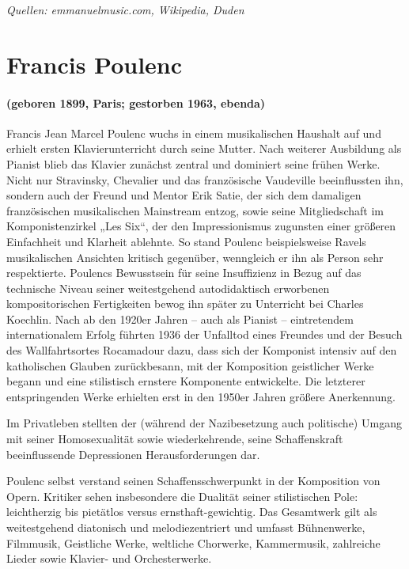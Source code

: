 \documentclass[11pt, ngermanm, titlepage]{article}
\begin{document}
\begin{multicols}{2}
	\textit{Quellen: emmanuelmusic.com,	Wikipedia, Duden}
	
	
	\section*{Francis Poulenc}
	\paragraph{(geboren 1899, Paris; gestorben 1963, ebenda)\newline}
	Francis Jean Marcel Poulenc wuchs in einem musikalischen Haushalt auf und erhielt ersten Klavierunterricht durch seine Mutter. Nach weiterer Ausbildung als Pianist blieb das Klavier zunächst zentral und dominiert seine frühen Werke. Nicht nur Stravinsky, Chevalier und das französische Vaudeville beeinflussten ihn, sondern auch der Freund und Mentor Erik Satie, der sich dem damaligen französischen musikalischen Mainstream entzog, sowie seine Mitgliedschaft im Komponistenzirkel „Les Six“, der den Impressionismus zugunsten einer größeren Einfachheit und Klarheit ablehnte. So stand Poulenc beispielsweise Ravels musikalischen Ansichten kritisch gegenüber, wenngleich er ihn als Person sehr respektierte. Poulencs Bewusstsein für seine Insuffizienz in Bezug auf das technische Niveau seiner weitestgehend autodidaktisch erworbenen kompositorischen Fertigkeiten bewog ihn später zu Unterricht bei Charles Koechlin. Nach ab den 1920er Jahren – auch als Pianist – eintretendem internationalem Erfolg führten 1936 der Unfalltod eines Freundes und der Besuch des Wallfahrtsortes Rocamadour dazu, dass sich der Komponist intensiv auf den katholischen Glauben zurückbesann, mit der Komposition geistlicher Werke begann und eine stilistisch ernstere Komponente entwickelte. Die letzterer entspringenden Werke erhielten erst in den 1950er Jahren größere Anerkennung.
	
	Im Privatleben stellten der (während der Nazibesetzung auch politische) Umgang mit seiner Homosexualität sowie wiederkehrende, seine Schaffenskraft beeinflussende Depressionen Herausforderungen dar.
	
	Poulenc selbst verstand seinen Schaffensschwerpunkt in der Komposition von Opern. Kritiker sehen insbesondere die Dualität seiner stilistischen Pole: leichtherzig bis pietätlos versus ernsthaft-gewichtig. Das Gesamtwerk gilt als weitestgehend diatonisch und melodiezentriert und umfasst Bühnenwerke, Filmmusik, Geistliche Werke, weltliche Chorwerke, Kammermusik, zahlreiche Lieder sowie Klavier- und Orchesterwerke.
	

\end{multicols}
\end{document}
